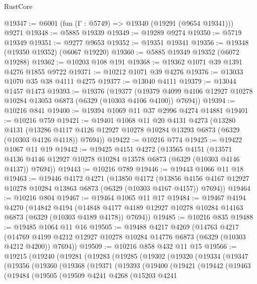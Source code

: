 \begin{lexlean}{RustCore}
\begin{coremodule}
@19347 := @6001 (fun (Γ : @5749) => @19340 (@19291 (@9654 @19341))) @9271
@19348 := @5885 @19339
@19349 := @19289 @9274
@19350 := @5719 @19349
@19351 := @9277 @9653
@19352 := @19351 @19341
@19356 := @19348 (@19350 @19352) (@6067 @19220)
@19360 := @5885 @19349 @19352 (@6072 @19288)
@19362 := @10203 @108 @191
@19368 := @19362 @1071 @39 @1391 @4276 @1855 @9722
@19371 := @10212 @1071 @39 @4276
@19376 := @13033 @1070 @35 @38 @4111 @4275
@19377 := @13040 @4111
@19379 := @13044 @1457 @1473
@19393 := @19376
    (@19377
      (@19379 @4099 @4106 @12927 @10278 @10284 @13053 @6873 (@6329 (@10303 @4106 @4100)) @7694))
@19394 := @10216 @841
@19400 := @19394 @1069 @11 @37 @2996 @4274 @14881
@19401 := @10216 @759
@19421 := @19401
    @1068
    @11
    @20
    @4131
    @4273
    (@13280
      @4131
      (@13286 @4117 @4126 @12927 @10278 @10284 @13293 @6873 (@6329 (@10303 @4126 @4118)) @7694))
@19422 := @10216 @774
@19425 := @19422 @1067 @11 @19
@19442 := @19425
    @4151
    @4272
    (@13565
      @4151
      (@13571 @4136 @4146 @12927 @10278 @10284 @13578 @6873 (@6329 (@10303 @4146 @4137)) @7694))
@19443 := @10216 @789
@19446 := @19443 @1066 @11 @18
@19463 := @19446
    @4172
    @4271
    (@13850
      @4172
      (@13856 @4156 @4167 @12927 @10278 @10284 @13863 @6873 (@6329 (@10303 @4167 @4157)) @7694))
@19464 := @10216 @804
@19467 := @19464 @1065 @11 @17
@19484 := @19467
    @4194
    @4270
    (@14842
      @4194
      (@14848 @4177 @4189 @12927 @10278 @10284 @14163 @6873 (@6329 (@10303 @4189 @4178)) @7694))
@19485 := @10216 @835
@19488 := @19485 @1064 @11 @16
@19505 := @19488
    @4217
    @4269
    (@14763
      @4217
      (@14769 @4199 @4212 @12927 @10278 @10284 @14776 @6873 (@6329 (@10303 @4212 @4200)) @7694))
@19509 := @10216 @858 @432 @11 @15
@19566 := @19215
    (@19240
      (@19281
        (@19283
          (@19285
            (@19302
              (@19320
                (@19334
                  (@19347
                    (@19356
                      (@19360
                        (@19368
                          (@19371
                            (@19393
                              (@19400
                                (@19421
                                  (@19442
                                    (@19463
                                      (@19484
                                        (@19505
                                          (@19509
                                            @4241
                                            @4268
                                            (@15203
                                              @4241

\end{coremodule}
\end{lexlean}
